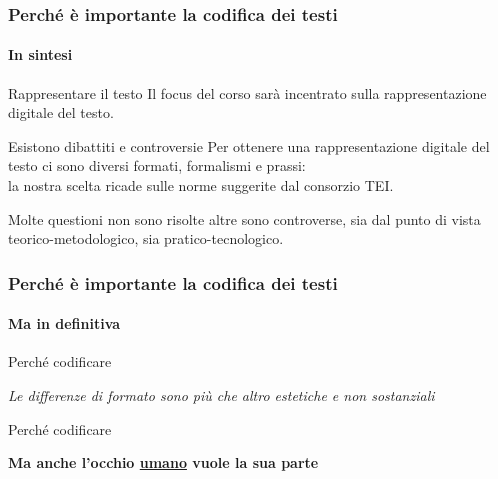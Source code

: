 \begin{frame}
    \frametitle{Perché è importante la codifica dei testi}
    \framesubtitle{In sintesi}
    \addtocounter{nframe}{1}
    
    \begin{block}{Rappresentare il testo}
         Il focus del corso sarà incentrato sulla rappresentazione digitale del testo.
    \end{block}

    \begin{block}{Esistono dibattiti e controversie}
        Per ottenere una rappresentazione digitale del testo ci sono diversi formati, formalismi e prassi:
        \\ la nostra scelta ricade sulle norme suggerite dal consorzio TEI.
    
        Molte questioni non sono risolte altre sono controverse, sia dal punto di vista teorico-metodologico, sia pratico-tecnologico.
   
    \end{block}

\end{frame}

\begin{frame}
    \frametitle{Perché è importante la codifica dei testi}
    \framesubtitle{Ma in definitiva}
    \addtocounter{nframe}{1}
    
    \begin{block}{Perché codificare}

        \begin{center}
            \textit{Le differenze di formato sono più che altro estetiche e non sostanziali}
        \end{center}

    \end{block}
     

    \begin{block}{Perché codificare}

        \begin{center}
            \textbf{Ma anche l'occhio \underline{umano} vuole la sua parte}
        \end{center}
       
    \end{block}

\end{frame}

